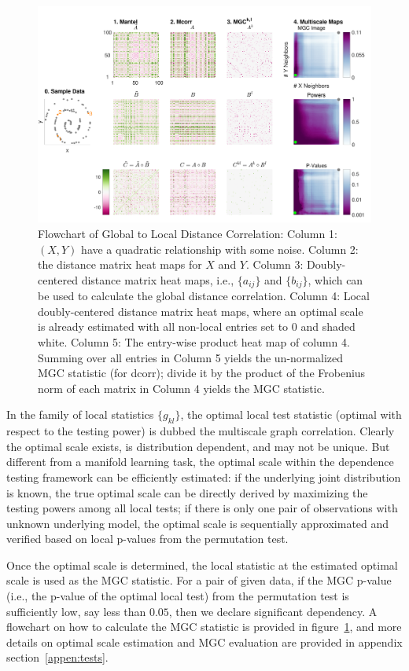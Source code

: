 \documentclass[11pt]{article}
\begin{document}
\begin{figure}[htbp]
\includegraphics[width=1.0\textwidth]{../Figures/FigA}
\caption{
Flowchart of Global to Local Distance Correlation: Column 1: $(X,Y)$ have a quadratic relationship with some noise. Column 2: the distance matrix heat maps for $X$ and $Y$. Column 3: Doubly-centered distance matrix heat maps, i.e., $\{a_{ij}\}$ and $\{b_{ij}\}$, which can be used to calculate the global distance correlation. Column 4: Local doubly-centered distance matrix heat maps, where an optimal scale is already estimated with all non-local entries set to $0$ and shaded white. Column 5: The entry-wise product heat map of column 4. Summing over all entries in Column 5 yields the un-normalized MGC statistic (for dcorr); divide it by the product of the Frobenius norm of each matrix in Column 4 yields the MGC statistic. }
\label{fig:A}
\end{figure}

In the family of local statistics $\{g_{kl}\}$, the optimal local test statistic (optimal with respect to the testing power) is dubbed the multiscale graph correlation. Clearly the optimal scale exists, is distribution dependent, and may not be unique. But different from a manifold learning task, the optimal scale within the dependence testing framework can be efficiently estimated: if the underlying joint distribution is known, the true optimal scale can be directly derived by maximizing the testing powers among all local tests; if there is only one pair of observations with unknown underlying model, the optimal scale is sequentially approximated and verified based on local p-values from the permutation test. 

Once the optimal scale is determined, the local statistic at the estimated optimal scale is used as the MGC statistic. For a pair of given data, if the MGC p-value (i.e., the p-value of the optimal local test) from the permutation test is sufficiently low, say less than $0.05$, then we declare significant dependency. A flowchart on how to calculate the MGC statistic is provided in figure~\ref{fig:A}, and more details on optimal scale estimation and MGC evaluation are provided in appendix section~\ref{appen:tests}.
\end{document}
